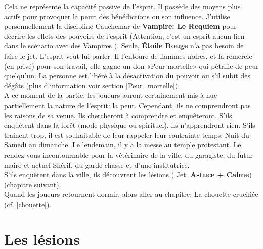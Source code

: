 \documentclass[oneside,12pt]{book}
\newcommand\roll[1]{
( Jet: \textbf{#1})
}
\newcommand{\Lynn}{\textbf{Étoile Rouge} }
\begin{document}
\begin{flushleft}
Cela ne représente la capacité passive de l'esprit. Il possède des moyens plus actifs pour provoquer la peur: des bénédictions ou son influence. J'utilise personnellement la discipline Cauchemar de \textbf{Vampire: Le Requiem} pour décrire les effets des pouvoirs de l'esprit (Attention, c'est un esprit aucun lien dans le scénario avec des Vampires ).
Seule, \Lynn n'a pas besoin de faire le jet. L'esprit veut lui parler. 
Il l'entoure de flammes noires, et la remercie (en privé) pour son travail, elle gagne un don «Peur mortelle»  qui pétrifie de peur quelqu'un. La personne est libéré à la désactivation du pouvoir ou s'il subit des dégâts (plus d'information voir section \ref{Peur_mortelle}).\\
A ce moment de la partie, les joueurs auront certainement mis à nue partiellement la nature de l'esprit: la peur. Cependant, ils ne comprendront pas les raisons de sa venue. Ils chercheront à comprendre et enquêteront. 
S'ils enquêtent dans la forêt (mode physique ou spirituel), ils n'apprendront rien. 
S'ils trainent trop, il est souhaitable de leur rappeler leur contrainte temps: Nuit du Samedi au dimanche. Le lendemain, il y a la messe au temple protestant. 
Le rendez-vous incontournable pour la vétérinaire de la ville, du garagiste, du futur maire et actuel Shérif, du garde chasse et d'une institutrice.\\  
S'ils enquêtent dans la ville, ils découvrent les lésions \roll{Astuce + Calme} (chapitre suivant). \\
Quand les joueurs retournent dormir, alors aller au chapitre: La chouette crucifiée (cf. \ref{chouette}). 


\section{Les lésions}

\end{flushleft}
\end{document}
